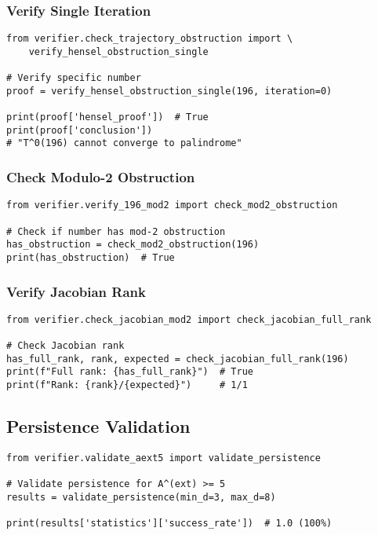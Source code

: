 \documentclass[11pt,a4paper]{article}
\begin{document}
\subsubsection{Verify Single Iteration}

\begin{lstlisting}[style=pythonstyle, caption={Verify Hensel Obstruction}]
from verifier.check_trajectory_obstruction import \
    verify_hensel_obstruction_single

# Verify specific number
proof = verify_hensel_obstruction_single(196, iteration=0)

print(proof['hensel_proof'])  # True
print(proof['conclusion'])    
# "T^0(196) cannot converge to palindrome"
\end{lstlisting}

\subsubsection{Check Modulo-2 Obstruction}

\begin{lstlisting}[style=pythonstyle, caption={Modulo-2 Check}]
from verifier.verify_196_mod2 import check_mod2_obstruction

# Check if number has mod-2 obstruction
has_obstruction = check_mod2_obstruction(196)
print(has_obstruction)  # True
\end{lstlisting}

\subsubsection{Verify Jacobian Rank}

\begin{lstlisting}[style=pythonstyle, caption={Jacobian Verification}]
from verifier.check_jacobian_mod2 import check_jacobian_full_rank

# Check Jacobian rank
has_full_rank, rank, expected = check_jacobian_full_rank(196)
print(f"Full rank: {has_full_rank}")  # True
print(f"Rank: {rank}/{expected}")     # 1/1
\end{lstlisting}

\subsection{Persistence Validation}

\begin{lstlisting}[style=pythonstyle, caption={Validate Persistence}]
from verifier.validate_aext5 import validate_persistence

# Validate persistence for A^(ext) >= 5
results = validate_persistence(min_d=3, max_d=8)

print(results['statistics']['success_rate'])  # 1.0 (100%)
\end{lstlisting}
\end{document}
